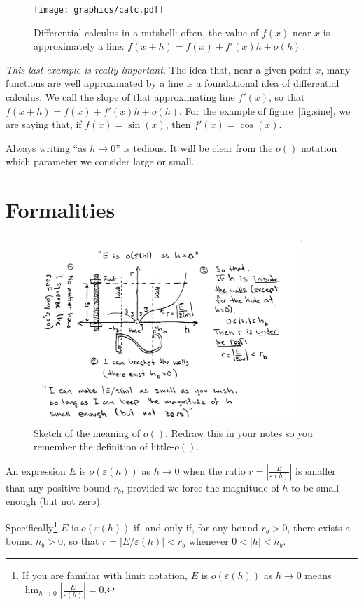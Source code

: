 \begin{figure}
\texttt{[image: graphics/calc.pdf]}
\caption[Differential calculus.]{Differential calculus in a nutshell: often, the value of $f(x)$ near $x$ is approximately a line: $f(x+h)=f(x)+f'(x)h+o(h)\,$.}
\label{fig:calc}
\end{figure}
{\em This last example is really important.}  The idea that, near a given point  $x$,  many functions are well approximated by a line is a foundational idea of differential calculus.  We call the slope of that approximating line  $f'(x)$, so that $f(x+h)=f(x)+f'(x)h+o(h)$.  For the example of figure~\ref{fig:sine}, we are saying that, if $f(x) = \sin(x)$, then  $f'(x)=\cos(x)$.  
 
Always writing ``as  $h \rightarrow 0$'' is tedious.  It will be clear from the $o()$ notation which parameter we consider large or small. 

\section{Formalities}
\begin{figure}
\begin{center}
\includegraphics[width=4in]{graphics/littleo.png}
\end{center}
\caption[$o()$ sketch.]{Sketch of the meaning of $o()$.  Redraw this in your notes so you remember the definition of little-$o()$.}
\label{fig:littleo}
\end{figure}

An expression $E$ is  $o(\varepsilon(h))$ as $h \rightarrow 0$ when the ratio $r = \left| \frac{E}{\varepsilon(h)} \right|$ is smaller than any positive bound $r_b$, provided we force the magnitude of $h$ to be small enough (but not zero). 

Specifically\footnote{If you are familiar with limit notation, $E$ is  $o(\varepsilon(h))$ as $h \rightarrow 0$ means $\lim_{h\rightarrow 0} \left|\frac{E}{\varepsilon(h)}\right| = 0$.} $E$ is  $o(\varepsilon(h))$ if, and only if, for any bound $r_b>0$, there exists a bound $h_b>0$, so that $r=|E/\varepsilon(h)|<r_b$ whenever $0 < |h| < h_b$.

